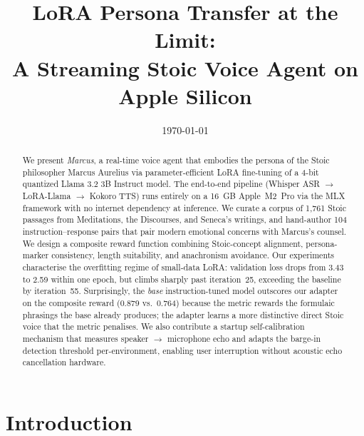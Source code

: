 \documentclass{ecsproject}
\begin{document}
\frontmatter
\title      {LoRA Persona Transfer at the Limit:\\
             A Streaming Stoic Voice Agent on Apple Silicon}
\date       {\today}
\maketitle
\begin{abstract}
We present \emph{Marcus}, a real-time voice agent that embodies the
persona of the Stoic philosopher Marcus Aurelius via parameter-efficient
LoRA fine-tuning of a 4-bit quantized Llama 3.2 3B Instruct model. The
end-to-end pipeline (Whisper ASR $\rightarrow$ LoRA-Llama $\rightarrow$
Kokoro TTS) runs entirely on a 16~GB Apple~M2~Pro via the MLX framework
with no internet dependency at inference. We curate a corpus of 1{,}761
Stoic passages from Meditations, the Discourses, and Seneca's writings,
and hand-author 104 instruction--response pairs that pair modern
emotional concerns with Marcus's counsel. We design a composite reward
function combining Stoic-concept alignment, persona-marker consistency,
length suitability, and anachronism avoidance. Our experiments
characterise the overfitting regime of small-data LoRA: validation loss
drops from 3.43 to 2.59 within one epoch, but climbs sharply past
iteration~25, exceeding the baseline by iteration~55. Surprisingly, the
\emph{base} instruction-tuned model outscores our adapter on the
composite reward (0.879 vs.\ 0.764) because the metric rewards the
formulaic phrasings the base already produces; the adapter learns a
more distinctive direct Stoic voice that the metric penalises. We also
contribute a startup self-calibration mechanism that measures speaker
$\rightarrow$ microphone echo and adapts the barge-in detection
threshold per-environment, enabling user interruption without acoustic
echo cancellation hardware.
\end{abstract}
\tableofcontents
\listoffigures
\listoftables
\mainmatter

\chapter{Introduction} \label{Chapter:Introduction}
\end{document}
